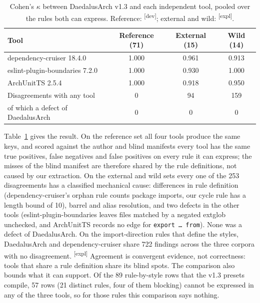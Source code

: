 \documentclass[10pt,a4paper]{article}
\newcommand{\devset}{\textsuperscript{\textsf{\tiny[dev]}}}
\newcommand{\explor}{\textsuperscript{\textsf{\tiny[expl]}}}
\newcommand{\tool}{DaedalusArch}
\newcommand{\dc}{dependency-cruiser}
\begin{document}
\begin{table}[t]
\centering\small
\caption{Cohen's $\kappa$ between \tool{} v1.3 and each independent tool, pooled over the rules both can express.
Reference: \devset{}; external and wild: \explor{}.}
\label{tab:v13-convergent}
\begin{tabular}{lccc}
\toprule
Tool & Reference (71) & External (15) & Wild (14) \\
\midrule
\dc{} 18.4.0 & 1.000 & 0.961 & 0.913 \\
eslint-plugin-boundaries 7.2.0 & 1.000 & 0.930 & 1.000 \\
ArchUnitTS 2.5.4 & 1.000 & 0.918 & 0.950 \\
\midrule
Disagreements with any tool & 0 & 94 & 159 \\
\quad of which a defect of \tool{} & 0 & 0 & 0 \\
\bottomrule
\end{tabular}
\end{table}

Table~\ref{tab:v13-convergent} gives the result. On the reference set all four tools produce the same keys, and
scored against the author and blind manifests every tool has the same true positives, false negatives and false
positives on every rule it can express; the misses of the blind manifest are therefore shared by the rule
definitions, not caused by our extraction. On the external and wild sets every one of the 253 disagreements has a
classified mechanical cause: differences in rule definition (\dc{}'s orphan rule counts package imports, our cycle
rule has a length bound of 10), barrel and alias resolution, and two defects in the other tools
(eslint-plugin-boundaries leaves files matched by a negated extglob unchecked, and ArchUnitTS records no edge for
\texttt{export \ldots{} from}). None was a defect of \tool{}. On the import-direction rules that define the styles,
\tool{} and \dc{} share 722 findings across the three corpora with no disagreement. \explor{}
Agreement is convergent evidence, not correctness: tools that share a rule definition share its blind spots. The
comparison also bounds what it can support. Of the 89 rule-by-style rows that the v1.3 presets compile, 57 rows (21
distinct rules, four of them blocking) cannot be expressed in any of the three tools, so for those rules this
comparison says nothing.
\end{document}
